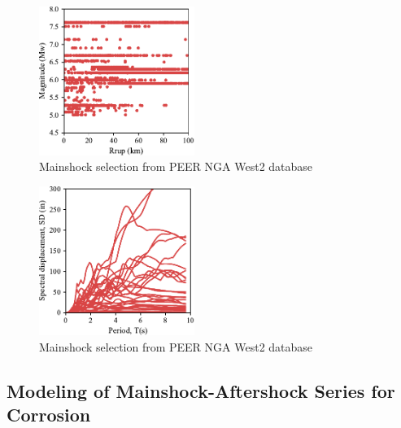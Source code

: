 \begin{figure}[htbp]
	\centering
	\includegraphics[width=0.45\textwidth]{Chapter-5/figs/GM_Selection.pdf}
	\caption{Mainshock selection from PEER NGA West2 database}
	\label{fig:GM_Selection}
\end{figure}

\begin{figure}[htbp]
	\centering
	\includegraphics[width=0.45\textwidth]{Chapter-5/figs/SD_Spectrum_GM_Selection.pdf}
	\caption{Mainshock selection from PEER NGA West2 database}
	\label{fig:DisplacementSpectrum_Selection}
\end{figure}

\subsection{Modeling of Mainshock-Aftershock Series for Corrosion}

